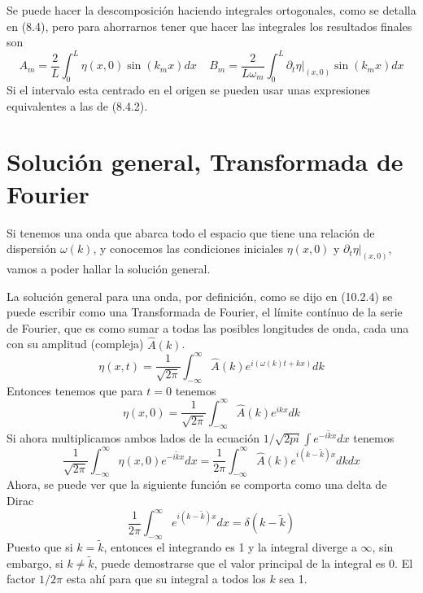 Se puede hacer la descomposición haciendo integrales ortogonales, como se detalla en (8.4), pero para ahorrarnos tener que hacer las integrales los resultados finales son
\begin{equation} \label{6.1.1}
    A_m = \frac{2}{L}\int_{0}^{L} \eta(x,0)\sin(k_m x)dx \ \ \ \ \ B_m = \frac{2}{L \omega_m}\int_{0}^{L} \partial_t \eta |_{(x,0)}\sin(k_m x)dx
\end{equation}
Si el intervalo esta centrado en el origen se pueden usar unas expresiones equivalentes a las de (8.4.2).
\section{Solución general, Transformada de Fourier}
Si tenemos una onda que abarca todo el espacio que tiene una relación de dispersión $\omega(k)$, y conocemos las condiciones iniciales $\eta(x,0)$ y $\partial_t \eta |_{(x,0)}$, vamos a poder hallar la solución general.

La solución general para una onda, por definición, como se dijo en (10.2.4) se puede escribir como una Transformada de Fourier, el límite contínuo de la serie de Fourier, que es como sumar a todas las posibles longitudes de onda, cada una con su amplitud (compleja) $\hat{A}(k)$.
\begin{equation} \label{6.1.1}
    \eta(x,t) = \frac{1}{\sqrt{2\pi}} \int_{-\infty}^\infty \hat{A}(k) e^{i(\omega(k)t + kx)}dk
\end{equation}
Entonces tenemos que para $t=0$ tenemos
\begin{equation} \label{6.1.1}
    \eta(x,0) = \frac{1}{\sqrt{2\pi}} \int_{-\infty}^\infty \hat{A}(k) e^{ikx}dk
\end{equation}
Si ahora multiplicamos ambos lados de la ecuación $1/\sqrt{2pi} \int e^{-i\tilde{k}x} dx$ tenemos
\[\frac{1}{\sqrt{2\pi}}\int_{-\infty}^\infty \eta(x,0) e^{-i\tilde{k}x}dx = \frac{1}{2\pi} \int_{-\infty}^\infty \hat{A}(k) e^{i(k-\tilde{k})x}dkdx\]
\newpage
Ahora, se puede ver que la siguiente función se comporta como una delta de Dirac
\begin{equation} \label{6.1.1}
    \frac{1}{2\pi} \int_{-\infty}^\infty e^{i(k-\tilde{k})x}dx = \delta(k-\tilde{k})
\end{equation}
Puesto que si $k = \tilde{k}$, entonces el integrando es 1 y la integral diverge a $\infty$, sin embargo, si $k \neq \tilde{k}$, puede demostrarse que el valor principal de la integral es 0. El factor $1/2\pi$ esta ahí para que su integral a todos los $k$ sea 1.

